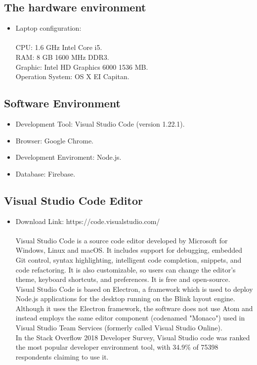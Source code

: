 \subsection{The hardware environment}
\begin{itemize}
\item Laptop configuration: \\ \\ CPU: 1.6 GHz Intel Core i5. \\ RAM: 8 GB 1600 MHz DDR3. \\ Graphic: Intel HD Graphics 6000 1536 MB. \\ Operation System: OS X EI Capitan.
\end{itemize}

\subsection{Software Environment}
\begin{itemize}
\item Development Tool: Visual Studio Code (version 1.22.1).
\item Browser: Google Chrome.
\item Development Enviroment: Node.js.
\item Database: Firebase.
\end{itemize}

\subsection{Visual Studio Code Editor}
\begin{itemize}
\item Download Link: https://code.visualstudio.com/ \\ \\ Visual Studio Code is a source code editor developed by Microsoft for Windows, Linux and macOS. It includes support for debugging, embedded Git control, syntax highlighting, intelligent code completion, snippets, and code refactoring. It is also customizable, so users can change the editor's theme, keyboard shortcuts, and preferences. It is free and open-source.\cite{1} \\ Visual Studio Code is based on Electron, a framework which is used to deploy Node.js applications for the desktop running on the Blink layout engine. Although it uses the Electron framework, the software does not use Atom and instead employs the same editor component (codenamed "Monaco") used in Visual Studio Team Services (formerly called Visual Studio Online).\cite{1} \\ In the Stack Overflow 2018 Developer Survey, Visual Studio code was ranked the most popular developer environment tool, with 34.9\% of 75398 respondents claiming to use it.\cite{1}
\end{itemize}

